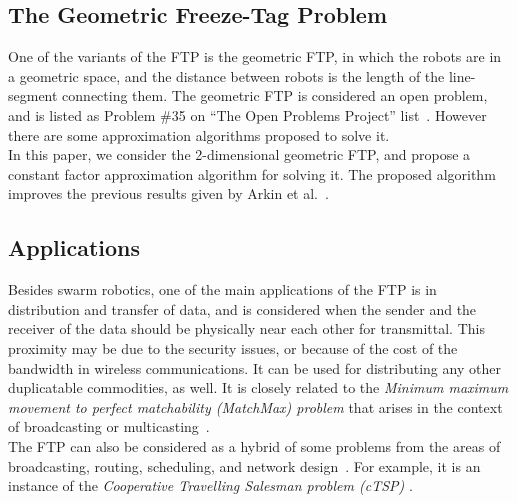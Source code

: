 \documentclass[review]{elsarticle}
\begin{document}
\subsection{The Geometric Freeze-Tag Problem}
One of the variants of the FTP is the geometric FTP, in which the robots are in a geometric space, and the distance between robots is the length of the line-segment connecting them. The geometric FTP is considered an open problem, and is listed as Problem \#35 on ``The Open Problems Project'' list~\cite{OpenProblems}. However there are some approximation algorithms proposed to solve it.\\
In this paper, we consider the 2-dimensional geometric FTP, and propose a constant factor approximation algorithm for solving it. The proposed algorithm improves the previous results given by Arkin et al.~\cite{Arkin2006}.

\subsection{Applications}
Besides swarm robotics, one of the main applications of the FTP is in distribution and transfer of data, and is considered when the sender and the receiver of the data should be physically near each other for transmittal. This proximity may be due to the security issues, or because of the cost of the bandwidth in wireless communications. It can be used for distributing any other duplicatable commodities, as well.
It is closely related to the \textit{Minimum maximum movement to perfect matchability (MatchMax) problem} that arises in the context of broadcasting or multicasting~\cite{Demaine2009}.\\
The FTP can also be considered as a hybrid of some problems from the areas of broadcasting, routing, scheduling, and network design~\cite{Arkin2006}. For example, it is an instance of the \textit{Cooperative Travelling Salesman problem (cTSP)} \cite{Armon2010}.
\end{document}
